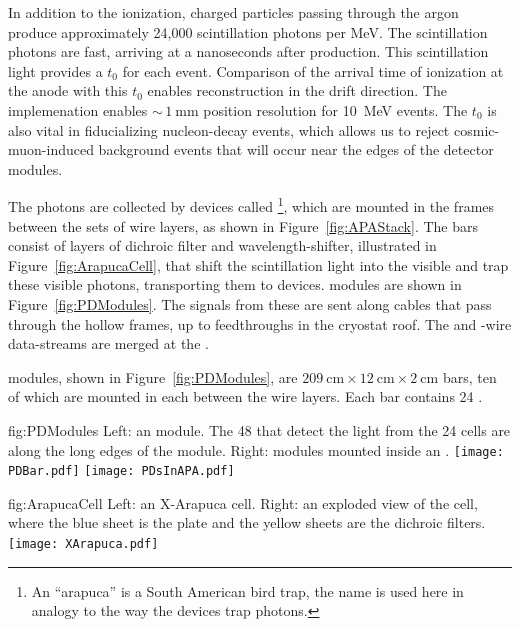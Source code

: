 In addition to the ionization, charged particles passing through the argon produce approximately 24,000 scintillation photons per \si{\mega\electronvolt}. The scintillation photons are fast, arriving at a  nanoseconds after production. This scintillation light provides a $t_{0}$ for each event. Comparison of the arrival time of ionization at the anode with this $t_{0}$ enables reconstruction in the drift direction. 
The  implemenation enables $\sim\,\SI{1}{\mm}$ position resolution for \SI{10}{\mega\electronvolt}  events. The  $t_{0}$ is also vital in fiducializing nucleon-decay events, which allows us to reject cosmic-muon-induced background events that will occur near the edges of the detector modules.

The photons are collected by devices called \footnote{An ``arapuca'' is a South American bird trap, the name is used here in analogy to the way the devices trap photons.}, which are mounted in the  frames between the sets of wire layers, as shown in Figure~\ref{fig:APAStack}. 
The  bars consist of layers of dichroic filter and wavelength-shifter, illustrated in Figure~\ref{fig:ArapucaCell}, that shift the  scintillation light into the visible and trap these visible photons, transporting them to  devices.  modules are shown in Figure~\ref{fig:PDModules}. The signals from these  are sent along cables that pass through the hollow  frames, up to feedthroughs in the cryostat roof. The  and -wire data-streams are merged at the .

 modules, shown in Figure~\ref{fig:PDModules}, are 
$\SI{209}{\cm}\times\SI{12}{\cm}\times\SI{2}{\cm}$ bars, ten of which are mounted in each  between the wire layers. Each bar contains 24 .


\begin{dunefigure}{fig:PDModules}
{Left: an   module. The 48  that detect the light from the 24 cells are along the long edges of the module. Right:   modules mounted inside an .}
\texttt{[image: PDBar.pdf]}
\texttt{[image: PDsInAPA.pdf]}
\end{dunefigure}

\begin{dunefigure}{fig:ArapucaCell}
{Left: an X-Arapuca cell. Right: an exploded view of the cell, where the blue sheet is the  plate and the yellow sheets are the dichroic filters.}
\texttt{[image: XArapuca.pdf]}
\end{dunefigure}

